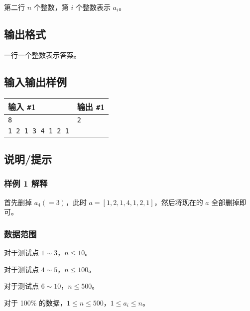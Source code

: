 \documentclass{article}
\begin{document}
	第二行 $n$ 个整数，第 $i$ 个整数表示 $a_i$。

	\subsection{输出格式}

	一行一个整数表示答案。

	\subsection{输入输出样例}

	\begin{tabularx}{\textwidth}{|X|X|}
		\hline
		\textbf{输入 \texttt{\#}1} & \textbf{输出 \texttt{\#}1} \\
		\hline
		\texttt{8} & \texttt{2} \\
		\texttt{1 2 1 3 4 1 2 1} & \\
		\hline
	\end{tabularx}

	\subsection{说明/提示}

	\subsubsection{样例 1 解释}

	首先删掉 $a_4(=3)$，此时 $a=[1,2,1,4,1,2,1]$，然后将现在的 $a$ 全部删掉即可。

	\subsubsection{数据范围}

	对于测试点 $1\sim 3$，$n\le 10$。

	对于测试点 $4\sim 5$，$n\le 100$。

	对于测试点 $6\sim 10$，$n\le 500$。

	对于 100\% 的数据，$1\le n\le 500$，$1\le a_i\le n$。
\end{document}
